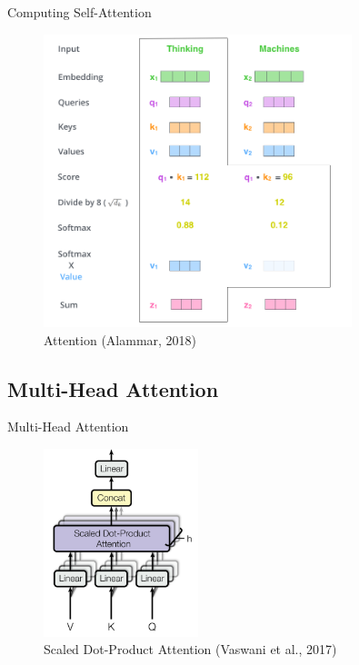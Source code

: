 \documentclass[10pt]{beamer}
\begin{document}
\begin{frame}{Computing Self-Attention}

\begin{figure}[h]
\centering
\includegraphics[width=0.8\textwidth]{fig/alammar_self-attention-output.png}
\caption{Attention (Alammar, 2018)}
\end{figure}

\end{frame}


\subsection{Multi-Head Attention}

\begin{frame}{Multi-Head Attention}

\begin{figure}[h]
\centering
\includegraphics[width=0.4\textwidth]{fig/Vaswani_2_multi_head.png}
\caption{Scaled Dot-Product Attention (Vaswani et al., 2017)}
\end{figure}

\end{frame}
\end{document}
